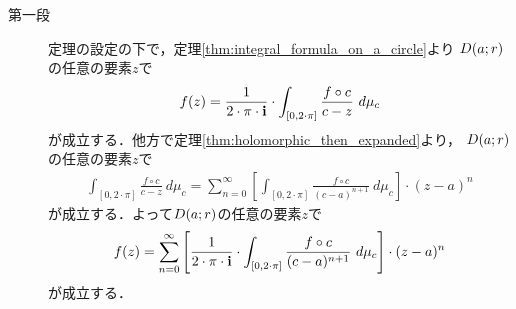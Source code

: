 	\begin{sketch}\mbox{}
		\begin{description}
			\item[第一段]
				定理の設定の下で，定理\ref{thm:integral_formula_on_a_circle}より
				$D(a;r)$の任意の要素$z$で
				\begin{align}
					f(z) = \frac{1}{2\cdot\pi\cdot\mathbf{i}} \cdot \int_{[0,2\cdot\pi]} \frac{f \circ c}{c - z}\ d\mu_{c}
				\end{align}
				が成立する．他方で定理\ref{thm:holomorphic_then_expanded}より，
				$D(a;r)$の任意の要素$z$で
				\begin{align}
					\int_{[0,2\cdot\pi]} \frac{f \circ c}{c - z}\ d\mu_{c}
					= \sum_{n=0}^{\infty} \left[ \int_{[0,2\cdot\pi]} \frac{f \circ c}{(c - a)^{n+1}}\ d\mu_{c} \right] \cdot (z-a)^{n}
				\end{align}
				が成立する．よって$D(a;r)$の任意の要素$z$で
				\begin{align}
					f(z) = \sum_{n=0}^{\infty} \left[ \frac{1}{2\cdot\pi\cdot\mathbf{i}} \cdot \int_{[0,2\cdot\pi]} \frac{f \circ c}{(c - a)^{n+1}}\ d\mu_{c} \right] \cdot (z-a)^{n}
				\end{align}
				が成立する．
			

\end{description}
\end{sketch}
